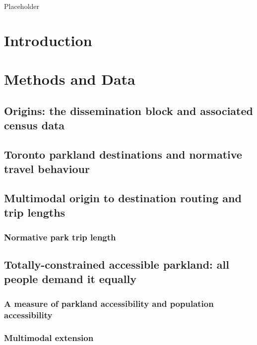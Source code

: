 \documentclass[
11pt, %
oneside, %
english, %
singlespacing, %
]{macthesis} %
\begin{document}
Placeholder

\section{Introduction}\label{introduction-1}

\section{Methods and Data}\label{methods-and-data}

\subsection{Origins: the dissemination block and associated census data}\label{origins-the-dissemination-block-and-associated-census-data}

\subsection{Toronto parkland destinations and normative travel behaviour}\label{toronto-parkland-destinations-and-normative-travel-behaviour}

\subsection{Multimodal origin to destination routing and trip lengths}\label{multimodal-origin-to-destination-routing-and-trip-lengths}

\subsubsection{Normative park trip length}\label{normative-park-trip-length}

\subsection{Totally-constrained accessible parkland: all people demand it equally}\label{totally-constrained-accessible-parkland-all-people-demand-it-equally}

\subsubsection{A measure of parkland accessibility and population accessibility}\label{a-measure-of-parkland-accessibility-and-population-accessibility}

\subsubsection{Multimodal extension}\label{multimodal-extension}
\end{document}
